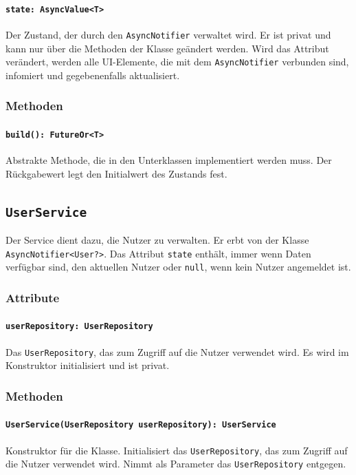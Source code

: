 \documentclass{entwurfsheft}
\begin{document}
\paragraph{\texttt{state: AsyncValue<T>}}
Der Zustand, der durch den \texttt{AsyncNotifier} verwaltet wird. Er ist privat und kann nur über die Methoden der Klasse geändert werden. Wird das Attribut verändert, werden alle UI-Elemente, die mit dem \texttt{AsyncNotifier} verbunden sind, infomiert und gegebenenfalls aktualisiert.
\subsubsection*{Methoden}
\paragraph{\texttt{build(): FutureOr<T>}}
Abstrakte Methode, die in den Unterklassen implementiert werden muss. Der Rückgabewert legt den Initialwert des Zustands fest.
\newpage
\subsection{\texttt{UserService}}\label{sec:UserService}
Der Service dient dazu, die Nutzer zu verwalten. Er erbt von der Klasse \texttt{AsyncNotifier<User?>}. Das Attribut \texttt{state} enthält, immer wenn Daten verfügbar sind, den aktuellen Nutzer oder \texttt{null}, wenn kein Nutzer angemeldet ist.

\subsubsection*{Attribute}
\paragraph{\texttt{userRepository: UserRepository}}
Das \texttt{UserRepository}, das zum Zugriff auf die Nutzer verwendet wird. Es wird im Konstruktor initialisiert und ist privat.
\subsubsection*{Methoden}
\paragraph{\texttt{UserService(UserRepository userRepository): UserService}}
Konstruktor für die Klasse. Initialisiert das \texttt{UserRepository}, das zum Zugriff auf die Nutzer verwendet wird. Nimmt als Parameter das \texttt{UserRepository} entgegen.
\end{document}
